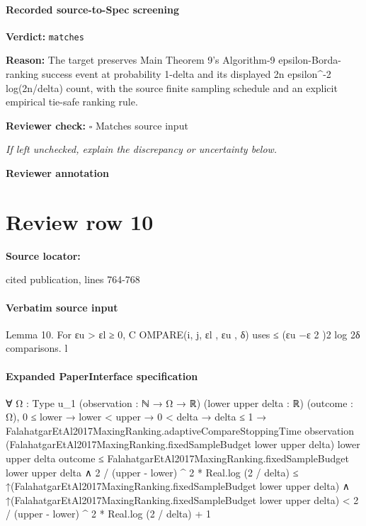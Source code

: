 \documentclass[10pt]{article}
\newcommand{\reviewerbox}{%
  \par\noindent\fbox{\parbox{0.96\linewidth}{\rule{0pt}{0.38in}}}\par
}
\newcommand{\reviewmatch}[1]{%
  \par\noindent\textbf{Reviewer check:} $\square$\; #1\par
  \noindent\emph{If left unchecked, explain the discrepancy or uncertainty below.}\par
}
\begin{document}
\paragraph{Recorded source-to-Spec screening}
\textbf{Verdict:} \texttt{matches}
\\
{\raggedright
\textbf{Reason:} The target preserves Main Theorem 9's Algorithm-\allowbreak{}9 epsilon-\allowbreak{}Borda-\allowbreak{}ranking success event at probability 1-\allowbreak{}delta and its displayed 2n epsilon\textasciicircum{}-\allowbreak{}2 log(2n/\allowbreak{}delta) count, with the source finite sampling schedule and an explicit empirical tie-\allowbreak{}safe ranking rule.\allowbreak{}
\par}
\reviewmatch{Matches source input}
\noindent\textbf{Reviewer annotation}\par
\reviewerbox
\clearpage
\hypertarget{source-claim-c39da77fbfc7426b}{}
\section*{Review row 10}
\textbf{Source locator:} {\footnotesize\raggedright cited publication, lines 764-\allowbreak{}768\par}
\paragraph{Verbatim source input}
\begin{ReviewVerbatim}
Lemma 10. For εu > εl ≥ 0, C OMPARE(i, j, εl , εu , δ) uses ≤ (εu −ε
                                                                  2
                                                                     )2
                                                                        log 2δ comparisons.
                                                                           l
\end{ReviewVerbatim}



\paragraph{Expanded PaperInterface specification}
\begin{ReviewVerbatim}
∀ {Ω : Type u_1} (observation : ℕ → Ω → ℝ) (lower upper delta : ℝ) (outcome : Ω),
  0 ≤ lower →
    lower < upper →
      0 < delta →
        delta ≤ 1 →
          FalahatgarEtAl2017MaxingRanking.adaptiveCompareStoppingTime observation
                (FalahatgarEtAl2017MaxingRanking.fixedSampleBudget lower upper delta) lower upper delta outcome ≤
              FalahatgarEtAl2017MaxingRanking.fixedSampleBudget lower upper delta ∧
            2 / (upper - lower) ^ 2 * Real.log (2 / delta) ≤
                ↑(FalahatgarEtAl2017MaxingRanking.fixedSampleBudget lower upper delta) ∧
              ↑(FalahatgarEtAl2017MaxingRanking.fixedSampleBudget lower upper delta) <
                2 / (upper - lower) ^ 2 * Real.log (2 / delta) + 1
\end{ReviewVerbatim}
\end{document}
